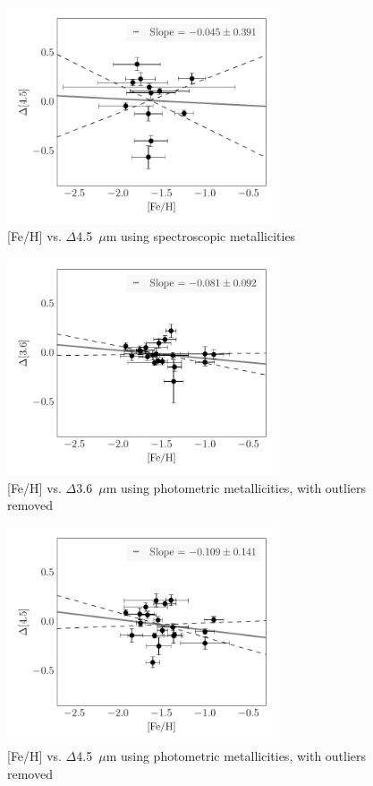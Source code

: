 \documentclass[a4paper,fleqn,usenatbib]{mnras}
\begin{document}
\begin{figure}
\begin{center}
\includegraphics[width=80mm]{final_plots/delta_feh_4p5_spect.pdf}
\caption{[Fe/H] vs. $\Delta$4.5~$\mu$m using spectroscopic metallicities}
\label{fig:delta_4p5_spect}
\end{center}
\end{figure}

\begin{figure}
\begin{center}
\includegraphics[width=80mm]{final_plots/delta_feh_3p6_phot_no_outlier.pdf}
\caption{[Fe/H] vs. $\Delta$3.6~$\mu$m using photometric metallicities, with outliers removed}
\label{fig:delta_3p6_phot}
\end{center}
\end{figure}

\begin{figure}
\begin{center}
\includegraphics[width=80mm]{final_plots/delta_feh_4p5_phot_no_outlier.pdf}
\caption{[Fe/H] vs. $\Delta$4.5~$\mu$m using photometric metallicities, with outliers removed}
\label{fig:delta_4p5_phot}
\end{center}
\end{figure}
\end{document}
